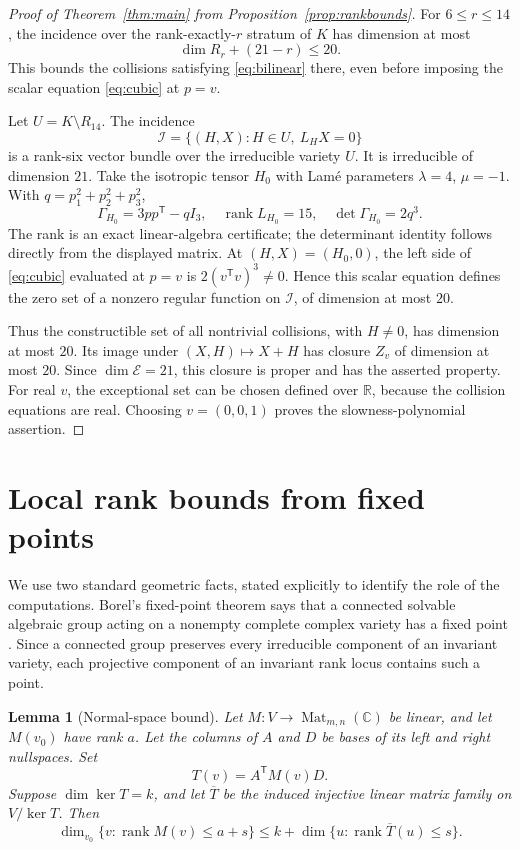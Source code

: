 \documentclass[11pt]{amsart}
\newtheorem{lemma}[theorem]{Lemma}
\theoremstyle{remark}
\newcommand{\C}{\mathbb C}
\newcommand{\R}{\mathbb R}
\newcommand{\E}{\mathcal E}
\newcommand{\rank}{\operatorname{rank}}
\begin{document}
\begin{proof}[Proof of Theorem~\ref{thm:main} from Proposition~\ref{prop:rankbounds}]
For $6\leq r\leq14$, the incidence over the rank-exactly-$r$ stratum of $K$ has dimension at most
\[
 \dim R_r+(21-r)\leq20.
\]
This bounds the collisions satisfying \eqref{eq:bilinear} there, even before imposing the scalar equation \eqref{eq:cubic} at $p=v$.

Let $U=K\setminus R_{14}$. The incidence
\[
 \mathcal I=\{(H,X):H\in U,\ L_HX=0\}
\]
is a rank-six vector bundle over the irreducible variety $U$. It is irreducible of dimension $21$. Take the isotropic tensor $H_0$ with Lam\'e parameters $\lambda=4$, $\mu=-1$. With $q=p_1^2+p_2^2+p_3^2$,
\begin{equation}\label{eq:isotropic}
 \Gamma_{H_0}=3pp^{\mathsf T}-qI_3,
 \quad\rank L_{H_0}=15,
 \quad\det\Gamma_{H_0}=2q^3.
\end{equation}
The rank is an exact linear-algebra certificate; the determinant identity follows directly from the displayed matrix. At $(H,X)=(H_0,0)$, the left side of \eqref{eq:cubic} evaluated at $p=v$ is $2(v^{\mathsf T}v)^3\ne0$. Hence this scalar equation defines the zero set of a nonzero regular function on $\mathcal I$, of dimension at most $20$.

Thus the constructible set of all nontrivial collisions, with $H\ne0$, has dimension at most $20$. Its image under $(X,H)\mapsto X+H$ has closure $Z_v$ of dimension at most $20$. Since $\dim\E=21$, this closure is proper and has the asserted property. For real $v$, the exceptional set can be chosen defined over $\R$, because the collision equations are real. Choosing $v=(0,0,1)$ proves the slowness-polynomial assertion.\qedhere
\end{proof}

\section{Local rank bounds from fixed points}\label{sec:normal}

We use two standard geometric facts, stated explicitly to identify the role of the computations. Borel's fixed-point theorem says that a connected solvable algebraic group acting on a nonempty complete complex variety has a fixed point \cite{borel1991,elek2020}. Since a connected group preserves every irreducible component of an invariant variety, each projective component of an invariant rank locus contains such a point.

\begin{lemma}[Normal-space bound]\label{lem:normal}
Let $M:V\to\operatorname{Mat}_{m,n}(\C)$ be linear, and let $M(v_0)$ have rank $a$. Let the columns of $A$ and $D$ be bases of its left and right nullspaces. Set
\[
 T(v)=A^{\mathsf T}M(v)D.
\]
Suppose $\dim\ker T=k$, and let $\overline T$ be the induced injective linear matrix family on $V/\ker T$. Then
\[
 \dim_{v_0}\{v:\rank M(v)\leq a+s\}
 \leq k+\dim\{u:\rank\overline T(u)\leq s\}.
\]
\end{lemma}
\end{document}

